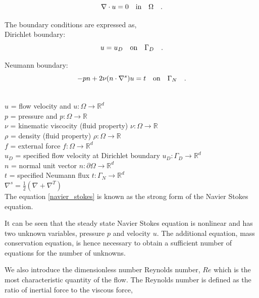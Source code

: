 \documentclass[a4paper]{book}
\begin{document}
\begin{equation}\label{mass_conservation}
\nabla \cdot u=0 \quad   \textnormal{in}  \quad \Omega \quad \textrm{.}
\end{equation}

The boundary conditions are expressed as,\\

Dirichlet boundary:
\begin{equation}\label{dirichlet_ns}
u=u_D \quad \textnormal{on} \quad \Gamma_D \quad \textrm{.}
\end{equation}

Neumann boundary:
\begin{equation} \label{neumann_ns}
-pn + 2\nu(n \cdot \nabla^s)u = t \quad   \textnormal{on}  \quad \Gamma_N \quad \textrm{.}
\end{equation}

$ $\\
$u$ = flow velocity and $u:\Omega \rightarrow \mathbb{R}^d$ \\
$p$ = pressure and $p:\Omega \rightarrow \mathbb{R}$\\
$\nu$ = kinematic viscocity (fluid property) $\nu:\Omega \rightarrow \mathbb{R}$\\ 
$\rho$ = density (fluid property) $\rho:\Omega \rightarrow \mathbb{R}$\\
$f$ = external force $f:\Omega \rightarrow \mathbb{R}^d$\\
$u_D$ = specified flow velocity at Dirichlet boundary $u_D:\Gamma_D \rightarrow \mathbb{R}^d$\\
$n$ = normal unit vector $n:\partial \Omega \rightarrow \mathbb{R}^d$\\
$t$ = specified Neumann flux $t:\Gamma_N \rightarrow \mathbb{R}^d$\\
$\nabla^s = \frac{1}{2}(\nabla + \nabla^T)$\\


The equation \eqref{navier_stokes} is known as the strong form of the Navier Stokes equation.

It can be seen that the steady state Navier Stokes equation is nonlinear and has two unknown variables, pressure $p$ and velocity $u$. The additional equation, mass conservation equation, is hence necessary to obtain a sufficient number of equations for the number of unknowns.

We also introduce the dimensionless number Reynolds number, $Re$ which is the most characteristic quantity of the flow. The Reynolds number is defined as the ratio of inertial force to the viscous force,
\end{document}

